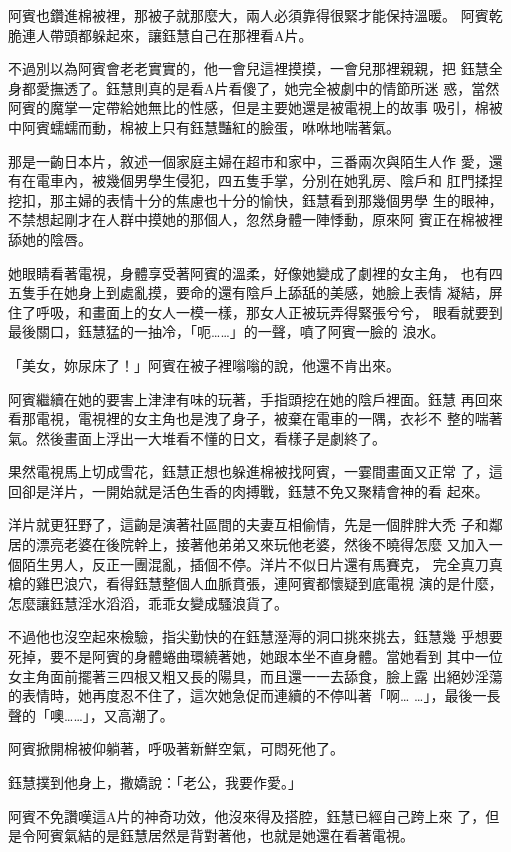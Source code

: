 阿賓也鑽進棉被裡，那被子就那麼大，兩人必須靠得很緊才能保持溫暖。
阿賓乾脆連人帶頭都躲起來，讓鈺慧自己在那裡看A片。

不過別以為阿賓會老老實實的，他一會兒這裡摸摸，一會兒那裡親親，把
鈺慧全身都愛撫透了。鈺慧則真的是看A片看傻了，她完全被劇中的情節所迷
惑，當然阿賓的魔掌一定帶給她無比的性感，但是主要她還是被電視上的故事
吸引，棉被中阿賓蠕蠕而動，棉被上只有鈺慧豔紅的臉蛋，咻咻地喘著氣。

那是一齣日本片，敘述一個家庭主婦在超市和家中，三番兩次與陌生人作
愛，還有在電車內，被幾個男學生侵犯，四五隻手掌，分別在她乳房、陰戶和
肛門揉捏挖扣，那主婦的表情十分的焦慮也十分的愉快，鈺慧看到那幾個男學
生的眼神，不禁想起剛才在人群中摸她的那個人，忽然身體一陣悸動，原來阿
賓正在棉被裡舔她的陰唇。

她眼睛看著電視，身體享受著阿賓的溫柔，好像她變成了劇裡的女主角，
也有四五隻手在她身上到處亂摸，要命的還有陰戶上舔舐的美感，她臉上表情
凝結，屏住了呼吸，和畫面上的女人一模一樣，那女人正被玩弄得緊張兮兮，
眼看就要到最後關口，鈺慧猛的一抽冷，「呃……」的一聲，噴了阿賓一臉的
浪水。

「美女，妳尿床了！」阿賓在被子裡嗡嗡的說，他還不肯出來。

阿賓繼續在她的要害上津津有味的玩著，手指頭挖在她的陰戶裡面。鈺慧
再回來看那電視，電視裡的女主角也是洩了身子，被棄在電車的一隅，衣衫不
整的喘著氣。然後畫面上浮出一大堆看不懂的日文，看樣子是劇終了。

果然電視馬上切成雪花，鈺慧正想也躲進棉被找阿賓，一霎間畫面又正常
了，這回卻是洋片，一開始就是活色生香的肉搏戰，鈺慧不免又聚精會神的看
起來。

洋片就更狂野了，這齣是演著社區間的夫妻互相偷情，先是一個胖胖大禿
子和鄰居的漂亮老婆在後院幹上，接著他弟弟又來玩他老婆，然後不曉得怎麼
又加入一個陌生男人，反正一團混亂，插個不停。洋片不似日片還有馬賽克，
完全真刀真槍的雞巴浪穴，看得鈺慧整個人血脈賁張，連阿賓都懷疑到底電視
演的是什麼，怎麼讓鈺慧淫水滔滔，乖乖女變成騷浪貨了。

不過他也沒空起來檢驗，指尖勤快的在鈺慧溼溽的洞口挑來挑去，鈺慧幾
乎想要死掉，要不是阿賓的身體蜷曲環繞著她，她跟本坐不直身體。當她看到
其中一位女主角面前擺著三四根又粗又長的陽具，而且還一一去舔食，臉上露
出絕妙淫蕩的表情時，她再度忍不住了，這次她急促而連續的不停叫著「啊…
…」，最後一長聲的「噢……」，又高潮了。

阿賓掀開棉被仰躺著，呼吸著新鮮空氣，可悶死他了。

鈺慧撲到他身上，撒嬌說：「老公，我要作愛。」

阿賓不免讚嘆這A片的神奇功效，他沒來得及搭腔，鈺慧已經自己跨上來
了，但是令阿賓氣結的是鈺慧居然是背對著他，也就是她還在看著電視。

